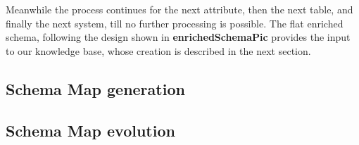 Meanwhile the process continues for the next attribute, then the next table, and finally the next system, till no further processing is possible. The flat enriched schema, following the design shown in \textbf{enrichedSchemaPic} provides the input to our knowledge base, whose creation is described in the next section.

\subsection*{Schema Map generation}
\label{schema_map_gen}


\subsection*{Schema Map evolution}
\label{schema_map_evol}

